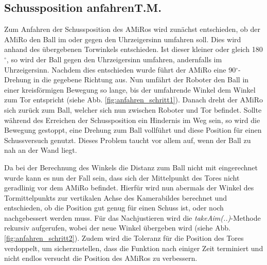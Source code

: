 
\subsection[Schussposition anfahren]{Schussposition anfahren\hfill {\normalsize T.M.}} %

Zum Anfahren der Schussposition des AMiRos wird zunächst entschieden, ob der AMiRo den Ball im oder gegen den Uhrzeigersinn umfahren soll. Dies wird anhand des übergebenen Torwinkels entschieden. Ist dieser kleiner oder gleich 180$^\circ$, so wird der Ball gegen den Uhrzeigersinn umfahren, andernfalls im Uhrzeigersinn.
Nachdem dies entschieden wurde führt der AMiRo eine 90$^\circ$-Drehung in die gegebene Richtung aus. 
Nun umfährt der Roboter den Ball in einer kreisförmigen Bewegung so lange, bis der umfahrende Winkel dem Winkel zum Tor entspricht (siehe Abb. \ref{fig:anfahren_schritt1}). Danach dreht der AMiRo sich zurück zum Ball, welcher sich nun zwischen Roboter und Tor befindet.
Sollte während des Erreichen der Schussposition ein Hindernis im Weg sein, so wird die Bewegung gestoppt, eine Drehung zum Ball vollführt und diese Position für einen Schussversuch genutzt. Dieses Problem taucht vor allem auf, wenn der Ball zu nah an der Wand liegt.

Da bei der Berechnung des Winkels die Distanz zum Ball nicht mit eingerechnet wurde kann es nun der Fall sein, dass sich der Mittelpunkt des Tores nicht geradlinig vor dem AMiRo befindet. Hierfür wird nun abermals der Winkel des Tormittelpunkts zur vertikalen Achse des Kamerabildes berechnet und entschieden, ob die Position gut genug für einen Schuss ist, oder noch nachgebessert werden muss. 
Für das Nachjustieren wird die \textit{takeAim(..)}-Methode rekursiv aufgerufen, wobei der neue Winkel übergeben wird (siehe Abb. \ref{fig:anfahren_schritt2}). Zudem wird die Toleranz für die Position des Tores verdoppelt, um sicherzustellen, dass die Funktion nach einiger Zeit terminiert und nicht endlos versucht die Position des AMiRos zu verbessern.

